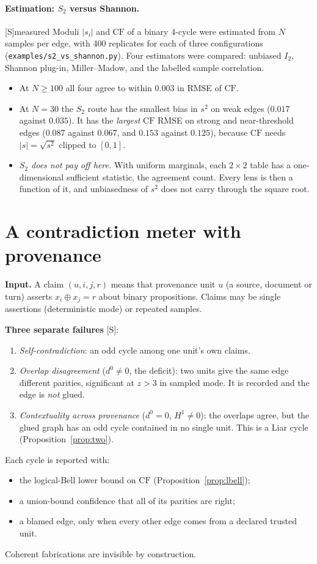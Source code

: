 \documentclass[11pt]{article}
\theoremstyle{definition}
\theoremstyle{remark}
\newcommand{\CF}{\mathrm{CF}}
\newcommand{\src}[1]{\textsf{\small[#1]}}
\newcommand{\st}[1]{\textsf{\small\color{gray}#1}}
\begin{document}
\paragraph{Estimation: $S_2$ versus Shannon.}\src{S}\st{measured}
Moduli $|s_i|$ and $\CF$ of a binary 4-cycle were estimated from $N$ samples per edge, with 400 replicates for each of three configurations (\texttt{examples/s2\_vs\_shannon.py}). Four estimators were compared: unbiased $I_2$, Shannon plug-in, Miller--Madow, and the labelled sample correlation.
\begin{itemize}
  \item At $N\ge100$ all four agree to within $0.003$ in RMSE of $\CF$.
  \item At $N=30$ the $S_2$ route has the smallest bias in $s^2$ on weak edges ($0.017$ against $0.035$). It has the \emph{largest} $\CF$ RMSE on strong and near-threshold edges ($0.087$ against $0.067$, and $0.153$ against $0.125$), because $\CF$ needs $|s|=\sqrt{s^2}$ clipped to $[0,1]$.
  \item \emph{$S_2$ does not pay off here.} With uniform marginals, each $2\times2$ table has a one-dimensional sufficient statistic, the agreement count. Every lens is then a function of it, and unbiasedness of $s^2$ does not carry through the square root.
\end{itemize}

\section{A contradiction meter with provenance}\label{sec:meter}
\textbf{Input.} A claim $(u,i,j,r)$ means that provenance unit $u$ (a source, document or turn) asserts $x_i\oplus x_j=r$ about binary propositions. Claims may be single assertions (deterministic mode) or repeated samples.

\textbf{Three separate failures} \src{S}:
\begin{enumerate}
  \item \emph{Self-contradiction}: an odd cycle among one unit's own claims.
  \item \emph{Overlap disagreement} ($d^0\neq0$, the deficit): two units give the same edge different parities, significant at $z>3$ in sampled mode. It is recorded and the edge is \emph{not} glued.
  \item \emph{Contextuality across provenance} ($d^0=0$, $H^1\neq0$): the overlaps agree, but the glued graph has an odd cycle contained in no single unit. This is a Liar cycle (Proposition~\ref{prop:two}).
\end{enumerate}
Each cycle is reported with:
\begin{itemize}
  \item the logical-Bell lower bound on $\CF$ (Proposition~\ref{prop:lbell});
  \item a union-bound confidence that all of its parities are right;
  \item a blamed edge, only when every other edge comes from a declared trusted unit.
\end{itemize}
Coherent fabrications are invisible by construction.
\end{document}
